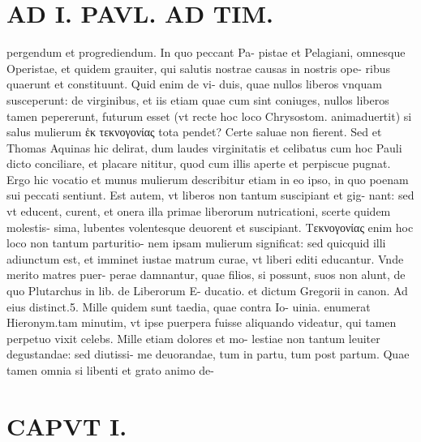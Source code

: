 \documentclass{article}
\begin{document}
\begin{pages}
\section*{AD I. PAVL. AD TIM. }
\marginpar{[ p.90 ]}\pstart pergendum et progrediendum. In quo peccant Pa- pistae et Pelagiani, omnesque Operistae, et quidem grauiter, qui salutis nostrae causas in nostris ope- ribus quaerunt et constituunt. Quid enim de vi- duis, quae nullos liberos vnquam susceperunt: de virginibus, et iis etiam quae cum sint coniuges, nullos liberos tamen pepererunt, futurum esset (vt recte hoc loco Chrysostom. animaduertit) si salus mulierum ἑκ τεκνογονίας tota pendet? Certe saluae non fierent. Sed et Thomas Aquinas hic delirat, dum laudes virginitatis et celibatus cum hoc Pauli dicto conciliare, et placare nititur, quod cum illis aperte et perpiscue pugnat. Ergo hic vocatio et munus mulierum describitur etiam in eo ipso, in quo poenam sui peccati sentiunt. Est autem, vt liberos non tantum suscipiant et gig- nant: sed vt educent, curent, et onera illa primae liberorum nutricationi, scerte quidem molestis- sima, lubentes volentesque deuorent et suscipiant. Tεκνογονίας enim hoc loco non tantum parturitio- nem ipsam mulierum significat: sed quicquid illi adiunctum est, et imminet iustae matrum curae, vt liberi editi educantur. Vnde merito matres puer- perae damnantur, quae filios, si possunt, suos non alunt, de quo Plutarchus in lib.  de Liberorum E- ducatio. et dictum Gregorii in canon. Ad eius distinct.5. Mille quidem sunt taedia, quae contra Io- uinia. enumerat Hieronym.tam minutim, vt ipse puerpera fuisse aliquando videatur, qui tamen perpetuo vixit celebs. Mille etiam dolores et mo- lestiae non tantum leuiter degustandae: sed diutissi- me deuorandae, tum in partu, tum post partum. Quae tamen omnia si libenti et grato animo de-  \pend
\section*{CAPVT  I. }
\marginpar{[ p.91 ]}\pstart {}
{}

\end{pages}
\end{document}
